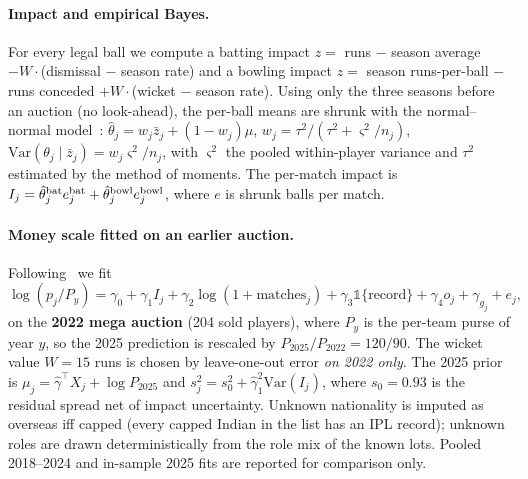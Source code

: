 \documentclass{article}
\newcommand{\1}{\mathbb{1}}
\begin{document}
\paragraph{Impact and empirical Bayes.} For every legal ball we compute a batting impact $z=$ runs $-$ season average $-W\cdot$(dismissal $-$ season rate) and a bowling impact $z=$ season runs-per-ball $-$ runs conceded $+W\cdot$(wicket $-$ season rate). Using only the three seasons before an auction (no look-ahead), the per-ball means are shrunk with the normal--normal model~\citep{efron1975}: $\hat\theta_j=w_j\bar z_j+(1-w_j)\mu$, $w_j=\tau^2/(\tau^2+\varsigma^2/n_j)$, $\mathrm{Var}(\theta_j\mid\bar z_j)=w_j\varsigma^2/n_j$, with $\varsigma^2$ the pooled within-player variance and $\tau^2$ estimated by the method of moments. The per-match impact is $I_j=\hat\theta^{\rm bat}_je^{\rm bat}_j+\hat\theta^{\rm bowl}_je^{\rm bowl}_j$, where $e$ is shrunk balls per match.

\paragraph{Money scale fitted on an earlier auction.} Following~\citet{karnik2010} we fit
\begin{equation}
 \log(p_j/P_y)=\gamma_0+\gamma_1I_j+\gamma_2\log(1+\text{matches}_j)+\gamma_3\1\{\text{record}\}+\gamma_4o_j+\gamma_{g_j}+e_j,\label{eq:hedonic}
\end{equation}
on the \textbf{2022 mega auction} (204 sold players), where $P_y$ is the per-team purse of year $y$, so the 2025 prediction is rescaled by $P_{2025}/P_{2022}=120/90$. The wicket value $W=15$ runs is chosen by leave-one-out error \emph{on 2022 only}. The 2025 prior is $\mu_j=\hat\gamma^\top X_j+\log P_{2025}$ and $s_j^2=s_0^2+\hat\gamma_1^2\mathrm{Var}(I_j)$, where $s_0=0.93$ is the residual spread net of impact uncertainty. Unknown nationality is imputed as overseas iff capped (every capped Indian in the list has an IPL record); unknown roles are drawn deterministically from the role mix of the known lots. Pooled 2018--2024 and in-sample 2025 fits are reported for comparison only.
\end{document}
